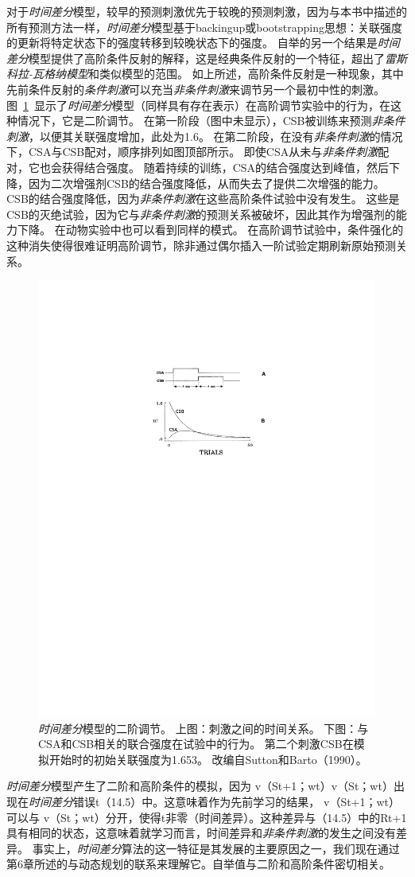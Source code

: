 {对于\textit{时间差分}模型，较早的预测刺激优先于较晚的预测刺激，因为与本书中描述的所有预测方法一样，\textit{时间差分}模型基于backingup或bootstrapping思想：关联强度的更新将特定状态下的强度转移到较晚状态下的强度。
自举的另一个结果是\textit{时间差分}模型提供了高阶条件反射的解释，这是经典条件反射的一个特征，超出了\textit{雷斯科拉-瓦格纳模型}和类似模型的范围。
如上所述，高阶条件反射是一种现象，其中先前条件反射的\textit{条件刺激}可以充当\textit{非条件刺激}来调节另一个最初中性的刺激。
图~\ref{fig:11_5}~显示了\textit{时间差分}模型（同样具有存在表示）在高阶调节实验中的行为，在这种情况下，它是二阶调节。
在第一阶段（图中未显示），CSB被训练来预测\textit{非条件刺激}，以便其关联强度增加，此处为1.6。
在第二阶段，在没有\textit{非条件刺激}的情况下，CSA与CSB配对，顺序排列如图顶部所示。
即使CSA从未与\textit{非条件刺激}配对，它也会获得结合强度。
随着持续的训练，CSA的结合强度达到峰值，然后下降，因为二次增强剂CSB的结合强度降低，从而失去了提供二次增强的能力。
CSB的结合强度降低，因为\textit{非条件刺激}在这些高阶条件试验中没有发生。
这些是CSB的灭绝试验，因为它与\textit{非条件刺激}的预测关系被破坏，因此其作为增强剂的能力下降。
在动物实验中也可以看到同样的模式。
在高阶调节试验中，条件强化的这种消失使得很难证明高阶调节，除非通过偶尔插入一阶试验定期刷新原始预测关系。


\begin{figure}[!htb]
	\centering
	\includegraphics[width=0.5\linewidth]{chap11/fig_11_5}
	\caption{\textit{时间差分}模型的二阶调节。
		上图：刺激之间的时间关系。
		下图：与CSA和CSB相关的联合强度在试验中的行为。
		第二个刺激CSB在模拟开始时的初始关联强度为1.653。
		改编自Sutton和Barto（1990）。 \label{fig:11_5}}
\end{figure}


\textit{时间差分}模型产生了二阶和高阶条件的模拟，因为 v（St+1；wt）v（St；wt）出现在\textit{时间差分}错误t（14.5）中。这意味着作为先前学习的结果， v（St+1；wt）可以与 v（St；wt）分开，使得t非零（时间差异）。这种差异与（14.5）中的Rt+1具有相同的状态，这意味着就学习而言，时间差异和\textit{非条件刺激}的发生之间没有差异。
事实上，\textit{时间差分}算法的这一特征是其发展的主要原因之一，我们现在通过第6章所述的与动态规划的联系来理解它。自举值与二阶和高阶条件密切相关。


}
